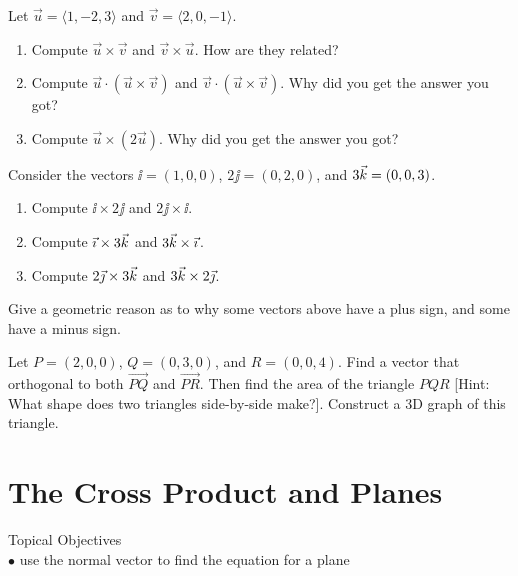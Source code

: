 \begin{problem}  
%
Let $\vec u=\langle 1,-2,3\rangle $ and $\vec v=\langle 2,0,-1\rangle$.  
\begin{enumerate}
\item Compute $\vec u\times \vec v$ and $\vec v\times \vec u$.  How are they related?
\item Compute $\vec u \cdot (\vec u\times \vec v)$ and $\vec v \cdot (\vec u\times \vec v)$. Why did you get the answer you got?
\item Compute $\vec u \times (2\vec u)$.  Why did you get the answer you got?
\end{enumerate}
\end{problem}

\begin{problem} 
%
Consider the vectors ${\ii}=(1,0,0)$, ${2\jj}=(0,2,0)$, and ${3\vec k}=(0,0,3)$.
\begin{enumerate}
\item Compute $\ii\times {2\jj}$ and ${2\jj}\times {\ii}$.
\item Compute ${\vec \imath}\times {3\ensuremath{\vec k}}$ and ${3\vec k}\times {\ensuremath{\vec \imath}}$.
\item Compute ${2\vec \jmath}\times {3\ensuremath{\vec k}}$ and ${3\vec k}\times {2\ensuremath{\vec \jmath}}$.
\end{enumerate}
Give a geometric reason as to why some vectors above have a plus sign, and some have a minus sign.
\end{problem}

\begin{problem}  
%
Let $P=(2,0,0)$, $Q=(0,3,0)$, and $R=(0,0,4)$. Find a vector that orthogonal to both $\vec {PQ}$ and $\vec {PR}$. Then find the area of the triangle $PQR$ [Hint: What shape does two triangles side-by-side make?]. Construct a 3D graph of this triangle. 
\end{problem}

\section{The Cross Product and Planes}
\large Topical Objectives \normalsize \\
\indent $\bullet$ use the normal vector to find the equation for a plane

